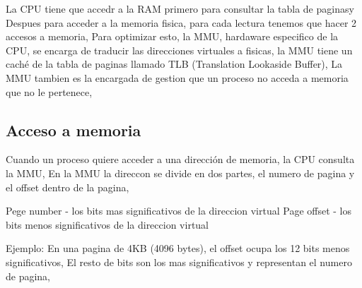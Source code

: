 La CPU tiene que accedr a la RAM primero para consultar la tabla de paginasy Despues para acceder a la memoria fisica, 
para cada lectura tenemos que hacer 2 accesos a memoria,
Para optimizar esto, la MMU, hardaware especifico de la CPU, se encarga de traducir las direcciones virtuales a fisicas,
la MMU tiene un caché de la tabla de paginas llamado TLB (Translation Lookaside Buffer),
La MMU tambien es la encargada de gestion que un proceso no acceda a memoria que no le pertenece,

\subsection{Acceso a memoria}

Cuando un proceso quiere acceder a una dirección de memoria, la CPU consulta la MMU,
En la MMU la direccon se divide en dos partes, el numero de pagina y el offset dentro de la pagina,

Pege number - los bits mas significativos de la direccion virtual
Page offset - los bits menos significativos de la direccion virtual

Ejemplo:
En una pagina de 4KB (4096 bytes), el offset ocupa los 12 bits menos significativos,
El resto de bits son los mas significativos y representan el numero de pagina,
